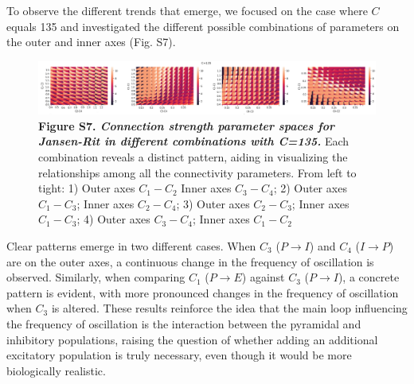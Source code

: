 \documentclass[12pt,twoside]{article}
\begin{document}
To observe the different trends that emerge, we focused on the case where $C$ equals 135 and investigated the different possible combinations of parameters on the outer and inner axes (Fig. S7).

\begin{figure}[H]
    \hspace{-1.3cm}
    \includegraphics[scale=0.58]{Images/JR_All_Config_new.png}
    \caption*{\textbf{Figure S7.  \textit{Connection strength parameter spaces for Jansen-Rit in different combinations with C=135.}} Each combination reveals a distinct pattern, aiding in visualizing the relationships among all the connectivity parameters. From left to tight: 1) Outer axes $C_{1}-C_{2}$ Inner axes $C_{3}-C_{4}$; 2) Outer axes $C_{1}-C_{3}$; Inner axes $C_{2}-C_{4}$; 3)  Outer axes $C_{2}-C_{3}$; Inner axes $C_{1}-C_{3}$; 4) Outer axes $C_{3}-C_{4}$; Inner axes $C_{1}-C_{2}$}            
    \label{fig:JR_C135}
\end{figure}

Clear patterns emerge in two different cases. When $C_{3}$ ($P \rightarrow I$) and $C_{4}$ ($I \rightarrow P$) are on the outer axes, a continuous change in the frequency of oscillation is observed. Similarly, when comparing $C_{1}$ ($P \rightarrow E$) against $C_{3}$ ($P \rightarrow I$), a concrete pattern is evident, with more pronounced changes in the frequency of oscillation when $C_{3}$ is altered. These results reinforce the idea that the main loop influencing the frequency of oscillation is the interaction between the pyramidal and inhibitory populations, raising the question of whether adding an additional excitatory population is truly necessary, even though it would be more biologically realistic. 
\end{document}
